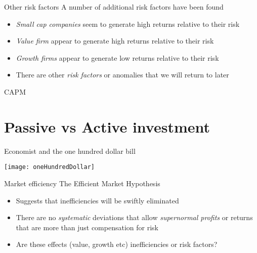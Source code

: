 \documentclass[14pt,xcolor=pdftex,dvipsnames,table]{beamer}\usepackage[]{graphicx}\usepackage[]{color}
\begin{document}
\begin{frame}{Other risk factors}
A number of additional risk factors have been found
\begin{itemize}[<+-| alert@+>]
\pause
\item \emph{Small cap companies} seem to generate high returns relative to their risk
\item \emph{Value firm} appear to generate high returns relative to their risk
\item \emph{Growth firms} appear to generate low returns relative to their risk
\item There are other \emph{risk factors} or anomalies that we will return to later
\end{itemize}
\end{frame}

\begin{frame}{CAPM}
\end{frame}

\section{Passive vs Active investment}
\begin{frame}{Economist and the one hundred dollar bill}
\begin{center}
\texttt{[image: oneHundredDollar]}
\end{center}
\end{frame}

\begin{frame}{Market efficiency}
The Efficient Market Hypothesis 
\begin{itemize}[<+-| alert@+>]
\pause
\item Suggests that inefficiencies will be swiftly eliminated
\item There are no \emph{systematic} deviations that allow \emph{supernormal profits} or returns that are more than just compensation for risk
\item Are these effects (value, growth etc) inefficiencies or risk factors? 
\end{itemize}
\end{frame}
\end{document}
